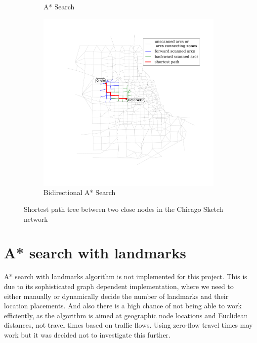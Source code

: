 \begin{figure}
\begin{subfigure}{.5\textwidth}
        \caption{A* Search}
        \label{fig:chicago_astar2}
    \end{subfigure}%
    \begin{subfigure}{.5\textwidth}
        \centering
        \includegraphics[width=\textwidth,trim=120px 120px 48px 0px,clip]{img/chicago_astar_bidirect2}
        \caption{Bidirectional A* Search}
        \label{fig:chicago_astar_bidirect2}
    \end{subfigure}
    \vspace{1em}
    \caption{Shortest path tree between two close nodes in the Chicago Sketch network}
    \label{fig:short_sptree}
\end{figure}

\section{A* search with landmarks}
A* search with landmarks algorithm is not implemented for this project.
This is due to its sophisticated graph dependent implementation,
where we need to either manually or dynamically decide the number of landmarks and their location placements.
And also there is a high chance of not being able to work efficiently,
as the algorithm is aimed at geographic node locations and Euclidean distances,
not travel times based on traffic flows.
Using zero-flow travel times may work but it was decided not to investigate this further.

